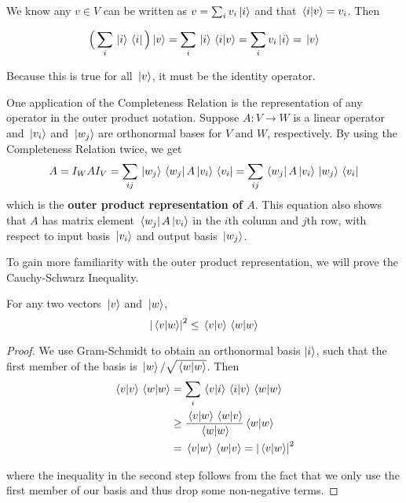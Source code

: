 \begin{lproof}
We know any $v \in V$ can be written as $v = \sum_{i} v_{i} \ket*{i}$ and that $\bra*{i} \ket*{v} = v_{i}$. Then 

$$\Big( \sum_{i} \ket*{i} \bra*{i} \Big) \ket*{v} = \sum_{i} \ket*{i} \bra*{i} \ket*{v} = \sum_{i} v_{i} \ket*{i} = \ket*{v}$$

Because this is true for all $\ket*{v}$, it must be the identity operator. 
\end{lproof}

One application of the Completeness Relation is the representation of any operator in the outer product notation. Suppose $A: V \rightarrow W$ is a linear operator and $\ket*{v_{i}}$ and $\ket*{w_{j}}$ are orthonormal bases for $V$ and $W$, respectively. By using the Completeness Relation twice, we get
$$A = I_{W} A I_{V} = \sum_{ij} \ket*{w_{j}} \bra*{w_{j}} A \ket*{v_{i}} \bra*{v_{i}} = \sum_{ij} \bra*{w_{j}} A \ket*{v_{i}} \ket*{w_{j}} \bra*{v_{i}}$$
which is the \textbf{outer product representation of $A$}. This equation also shows that $A$ has matrix element $\bra*{w_{j}}A\ket*{v_{i}}$ in the $i$th column and $j$th row, with respect to input basis $\ket*{v_{i}}$ and output basis $\ket*{w_{j}}$.

To gain more familiarity with the outer product representation, we will prove the Cauchy-Schwarz Inequality. 

\begin{theorem}
For any two vectors $\ket*{v}$ and $\ket*{w}$, $$\abs{\bra*{v}\ket*{w}}^{2} \leq \bra*{v}\ket*{v} \bra*{w}\ket*{w}$$
\end{theorem}

\begin{proof}
We use Gram-Schmidt to obtain an orthonormal basis $\ket{i}$, such that the first member of the basis is $\ket*{w} / \sqrt{\bra*{w}\ket*{w}}$. Then 
$$
\begin{aligned} 
\bra*{v}\ket*{v} \bra*{w}\ket*{w} &= \sum_{i} \bra*{v}\ket*{i} \bra*{i}\ket*{v} \bra*{w}\ket*{w} \\
&\geq \frac{\bra*{v}\ket*{w} \bra*{w}\ket*{v}}{\bra*{w}\ket*{w}} \bra*{w}\ket*{w} \\ 
&= \bra*{v}\ket*{w} \bra*{w}\ket*{v} = \abs{\bra*{v}\ket*{w}}^{2}
\end{aligned}
$$

where the inequality in the second step follows from the fact that we only use the first member of our basis and thus drop some non-negative terms.
\end{proof}


